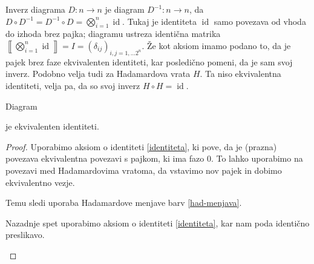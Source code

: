 \documentclass[mat1]{fmfdelo}
\newcommand{\interpret}[1]{\left\llbracket #1 \right\rrbracket}
\DeclareMathOperator*{\id}{id}
\begin{document}
Inverz diagrama \(D:n\to n\) je diagram \(D^{-1}:n\to n\), da \(D\circ D^{-1} = D^{-1}\circ D = \bigotimes_{i=1}^n\id\). Tukaj je identiteta \(\id\) samo povezava od vhoda do izhoda brez pajka; diagramu ustreza identična matrika \(\interpret{\bigotimes_{i=1}^n\id} = I = (\delta_{ij})_{i,j=1,\ldots 2^n}\). Že kot aksiom imamo podano to, da je pajek brez faze ekvivalenten identiteti, kar posledično pomeni, da je sam svoj inverz. Podobno velja tudi za Hadamardova vrata \(H\). Ta niso ekvivalentna identiteti, velja pa, da so svoj inverz \(H\circ H = \id\).
\begin{izrek}\label{had-inverz}
    Diagram
\begin{center}
\end{center}
je ekvivalenten identiteti.
\end{izrek}
\begin{proof}

Uporabimo aksiom o identiteti \ref{identiteta}, ki pove, da je (prazna) povezava ekvivalentna povezavi s pajkom, ki ima fazo 0. To lahko uporabimo na povezavi med Hadamardovima vratoma, da vstavimo nov pajek in dobimo ekvivalentno vezje.
\begin{center}
\end{center}
Temu sledi uporaba Hadamardove menjave barv \ref{had-menjava}.
\begin{center}
\end{center}
Nazadnje spet uporabimo aksiom o identiteti \ref{identiteta}, kar nam poda identično preslikavo.
\begin{center}
\end{center}
\end{proof}
\end{document}
